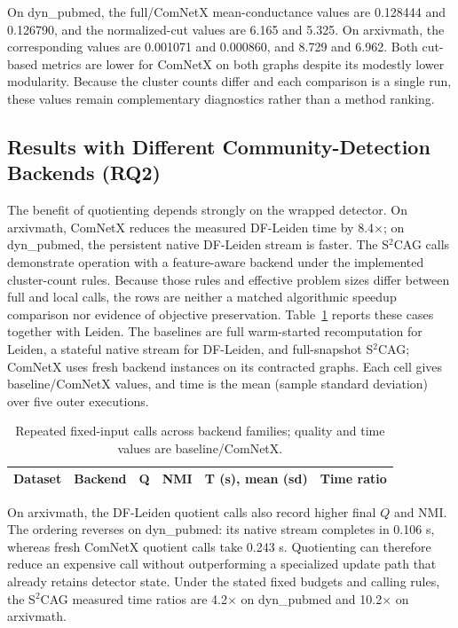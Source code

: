 \documentclass{ieeeaccess}
\begin{document}
On dyn\_pubmed, the full/ComNetX mean-conductance values are
0.128444 and 0.126790, and the normalized-cut values are 6.165 and 5.325. On
arxivmath, the corresponding values are 0.001071 and 0.000860, and 8.729 and
6.962. Both cut-based metrics are lower for ComNetX on both graphs despite its
modestly lower modularity. Because the cluster counts differ and each
comparison is a single run, these values remain complementary diagnostics
rather than a method ranking.

\subsection{Results with Different Community-Detection Backends (RQ2)}
\label{sec:backend_results}

The benefit of quotienting depends strongly on the wrapped detector. On
arxivmath, ComNetX reduces the measured DF-Leiden time by 8.4$\times$; on
dyn\_pubmed, the persistent native DF-Leiden stream is faster. The S$^2$CAG
calls demonstrate operation with a feature-aware backend under the implemented
cluster-count rules. Because those rules and effective problem sizes differ
between full and local calls, the rows are neither a matched algorithmic
speedup comparison nor evidence of objective preservation.
Table~\ref{tab:backends} reports these cases together with
Leiden. The baselines are full warm-started recomputation for Leiden, a
stateful native stream for DF-Leiden, and full-snapshot S$^2$CAG; ComNetX uses
fresh backend instances on its contracted graphs. Each cell gives
baseline/ComNetX values, and time is the mean (sample standard deviation) over
five outer executions.

\begin{table}[t]
\centering
\caption{Repeated fixed-input calls across backend families; quality and time
values are baseline/ComNetX.}
\label{tab:backends}
\setlength{\tabcolsep}{3.3pt}
\small
\begin{tabular}{@{}llcccc@{}}
\toprule
\textbf{Dataset} & \textbf{Backend} & \textbf{Q} & \textbf{NMI} &
\textbf{T (s), mean (sd)} & \textbf{Time ratio} \\
\midrule

\end{tabular}
\end{table}

On arxivmath, the DF-Leiden quotient calls also record higher final $Q$ and
NMI. The ordering reverses on dyn\_pubmed: its native stream completes in
0.106 s, whereas fresh ComNetX quotient calls take 0.243 s. Quotienting can
therefore reduce an expensive call without outperforming a specialized update
path that already retains detector state. Under the stated fixed budgets and
calling rules, the S$^2$CAG measured time ratios are 4.2$\times$ on
dyn\_pubmed and 10.2$\times$ on arxivmath.
\end{document}
